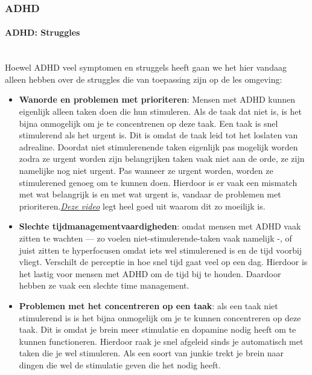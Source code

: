             \subsubsection{ADHD}

                \paragraph{ADHD: Struggles}\\
                    Hoewel ADHD veel symptomen en struggels heeft gaan we het hier vandaag alleen hebben over de struggles die van toepassing zijn op de les omgeving:
                    \begin{itemize}
                    
                        \item \textbf{Wanorde en problemen met prioriteren}: 
                            Mensen met ADHD kunnen eigenlijk alleen taken doen die hun stimuleren. Als de taak dat niet is, is het bijna onmogelijk om je te concentrenen op deze taak. Een taak is snel stimulerend als het urgent is. Dit is omdat de taak leid tot het loslaten van adrealine. Doordat niet stimulerenende taken eigenlijk pas mogelijk worden zodra ze urgent worden zijn belangrijken taken vaak niet aan de orde, ze zijn namelijke nog niet urgent. Pas wanneer ze urgent worden, worden ze stimulerened genoeg om te kunnen doen. Hierdoor is er vaak een mismatch met wat belangrijk is en met wat urgent is, vandaar de problemen met prioriteren.\emph{\hyperlink{https://www.youtube.com/watch?v=5xbD9t8cM4M}{Deze video}}\cite{ADHD-video-prioriteiten} legt heel goed uit waarom dit zo moeilijk is.
                        
                        \item \textbf{Slechte tijdmanagementvaardigheden}: 
                            omdat mensen met ADHD vaak zitten te wachten — zo voelen niet-stimulerende-taken vaak namelijk -, of juist zitten te hyperfocusen omdat iets wel stimulerened is en de tijd voorbij vliegt. Verschilt de perceptie in hoe snel tijd gaat veel op een dag. Hierdoor is het lastig voor mensen met ADHD om de tijd bij te houden. Daardoor hebben ze vaak een slechte time management. 
                        
                        \item \textbf{Problemen met het concentreren op een taak}: 
                            als een taak niet stimulerend is is het bijna onmogelijk om je te kunnen concentreren op deze taak. Dit is omdat je brein meer stimulatie en dopamine nodig heeft om te kunnen functioneren. Hierdoor raak je snel afgeleid sinds je automatisch met taken die je wel stimuleren. Als een soort van junkie trekt je brein naar dingen die wel de stimulatie geven die het nodig heeft.
                        

\end{itemize}
